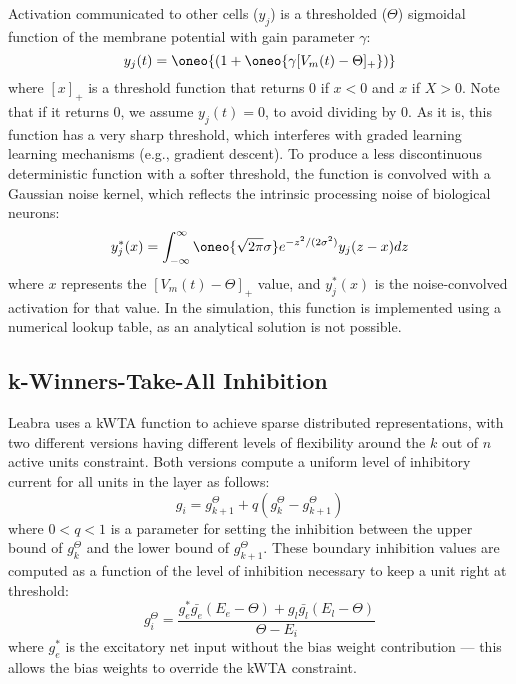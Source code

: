\documentclass[12pt,twoside]{article}
\begin{document}
Activation communicated to other cells ($y_j$) is a thresholded
($\Theta$) sigmoidal function of the membrane potential with gain
parameter $\gamma$:
\begin{equation}
  y_j(t) = \oneo{\left(1 + \oneo{\gamma [V_m(t) - \Theta]_+} \right)}
\end{equation}
where $[x]_+$ is a threshold function that returns 0 if $x<0$ and $x$
if $X>0$.  Note that if it returns 0, we assume $y_j(t) = 0$, to avoid
dividing by 0.  As it is, this function has a very sharp threshold,
which interferes with graded learning learning mechanisms (e.g.,
gradient descent).  To produce a less discontinuous deterministic
function with a softer threshold, the function is convolved with a
Gaussian noise kernel, which reflects the intrinsic processing noise
of biological neurons:
\begin{equation}
  y^*_j(x) = \int_{-\infty}^{\infty} \oneo{\sqrt{2 \pi} \sigma}
  e^{-z^2/(2 \sigma^2)} y_j(z-x) dz
  \label{eq.conv}
\end{equation}
where $x$ represents the $[V_m(t) - \Theta]_+$ value, and $y^*_j(x)$
is the noise-convolved activation for that value.  In the simulation,
this function is implemented using a numerical lookup table, as an
analytical solution is not possible.

\subsection{k-Winners-Take-All Inhibition}

Leabra uses a kWTA function to achieve sparse distributed
representations, with two different versions having different levels
of flexibility around the $k$ out of $n$ active units constraint.
Both versions compute a uniform level of inhibitory current for all
units in the layer as follows:
\begin{equation}
  g_i = g^{\Theta}_{k+1} + q (g^{\Theta}_k - g^{\Theta}_{k+1})
  \label{eq.g_i}
\end{equation}
where $0<q<1$ is a parameter for setting the inhibition between the
upper bound of $g^{\Theta}_k$ and the lower bound of
$g^{\Theta}_{k+1}$.  These boundary inhibition values are computed as
a function of the level of inhibition necessary to keep a unit right
at threshold:
\begin{equation}
  g_i^{\Theta} = \frac{g^*_e \bar{g_e} (E_e - \Theta) +
    g_l \bar{g_l} (E_l - \Theta)}{\Theta - E_i}
  \label{eq.i_at_thr}
\end{equation}
where $g^*_e$ is the excitatory net input without the bias weight
contribution --- this allows the bias weights to override the kWTA
constraint.
\end{document}
